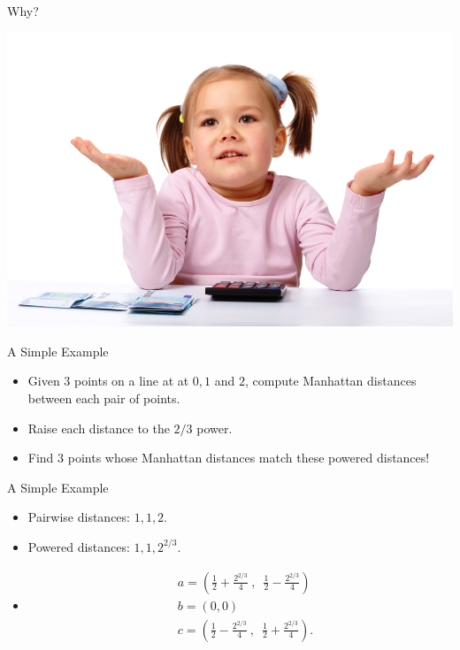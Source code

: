 \begin{frame} {Why?}
   \begin{center}
     \includegraphics[width=1\textwidth]{figs/why.jpg}
   \end{center}
\end{frame}
\begin{frame}{A Simple Example}
  \begin{itemize}
    \item <+-> Given $3$ points on a line at at $0, 1$ and $2$, compute
      Manhattan distances between each pair of points.
      \vs
    \item <+-> Raise each distance to the $2/3$ power.
      \vs
    \item <+-> Find $3$ points whose Manhattan distances match these
      powered distances!
  \end{itemize}
\end{frame}

\begin{frame}{A Simple Example}
  \begin{itemize}
    \item <+-> Pairwise distances: $1, 1, 2$.
      \vs
    \item <+-> Powered distances: $1, 1, 2^{2/3}$.
      \vs
    \item <+-> \begin{align}
      & a = \left(\frac{1}{2} + \frac{2^{2/3}}{4}\:,\enspace
      \frac{1}{2}-\frac{2^{2/3}}{4}\right)\nonumber \\
      & b = (0, 0) \nonumber \\
      & c=\left(\frac{1}{2}-\frac{2^{2/3}}{4}\:,\enspace
      \frac{1}{2}+\frac{2^{2/3}}{4}\right). \nonumber
    \end{align}
  \end{itemize}
\end{frame}


